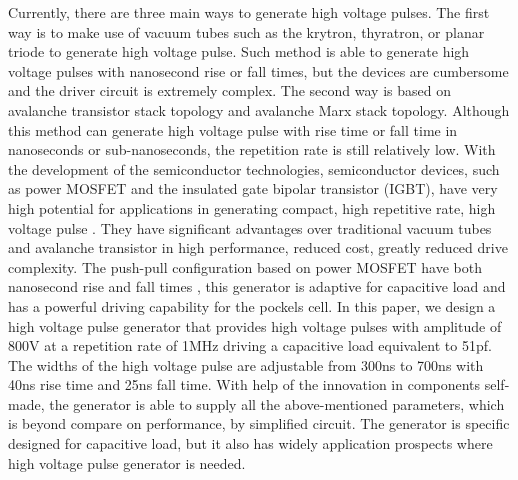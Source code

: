 \documentclass[aip,rsi,reprint,graphicx]{revtex4-1} %
\begin{document}
Currently, there are three main ways to generate high voltage pulses. 
The first way is to make use of vacuum tubes such as the krytron, thyratron, or planar triode to generate high voltage pulse\cite{Rohwein1995improved}. 
Such method is able to generate high voltage pulses with nanosecond rise or fall times, but the devices are cumbersome and the driver circuit is extremely complex. 
The second way is based on avalanche transistor stack topology and avalanche Marx stack topology\cite{Fulkerson1997,Bidin2009}. 
Although this method can generate high voltage pulse with rise time or fall time in nanoseconds or sub-nanoseconds, the repetition rate is still relatively low. 
With the development of the semiconductor technologies, semiconductor devices, such as power MOSFET and the insulated gate bipolar transistor (IGBT), have very high potential for applications in generating compact, high repetitive rate, high voltage pulse \cite{wang2013semiconductor,Feng2011}. 
They have significant advantages over traditional vacuum tubes and avalanche transistor in high performance, reduced cost, greatly reduced drive complexity. 
The push-pull configuration based on power MOSFET have both nanosecond rise and fall times \cite{bernius1990improved}, this generator is adaptive for capacitive load and has a powerful driving capability for the pockels cell.
In this paper, we design a high voltage pulse generator that provides high voltage pulses with amplitude of 800V at a repetition rate of 1MHz driving a capacitive load equivalent to 51pf.
 The widths of the high voltage pulse are adjustable from 300ns to 700ns with 40ns rise time and 25ns fall time. With help of the innovation in components self-made, the generator is able to supply all the above-mentioned parameters, which is beyond compare on performance, by simplified circuit.
 The generator is specific designed for capacitive load, but it also has widely application prospects where high voltage pulse generator is needed.
\end{document}
